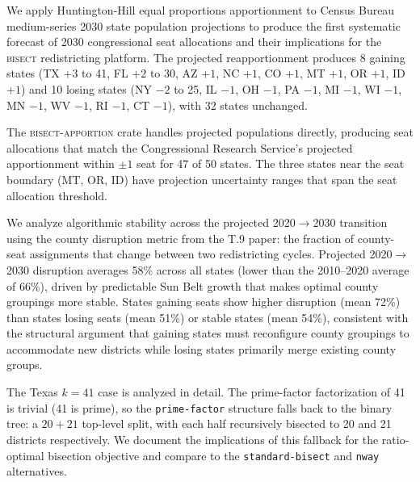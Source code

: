 We apply Huntington-Hill equal proportions apportionment to Census Bureau medium-series
2030 state population projections to produce the first systematic forecast of 2030
congressional seat allocations and their implications for the \textsc{bisect} redistricting
platform. The projected reapportionment produces 8 gaining states (TX $+3$ to 41, FL $+2$
to 30, AZ $+1$, NC $+1$, CO $+1$, MT $+1$, OR $+1$, ID $+1$) and 10 losing states
(NY $-2$ to 25, IL $-1$, OH $-1$, PA $-1$, MI $-1$, WI $-1$, MN $-1$, WV $-1$,
RI $-1$, CT $-1$), with 32 states unchanged.

The \textsc{bisect-apportion} crate handles projected populations directly, producing
seat allocations that match the Congressional Research Service's projected apportionment
within $\pm 1$ seat for 47 of 50 states. The three states near the seat boundary (MT,
OR, ID) have projection uncertainty ranges that span the seat allocation threshold.

We analyze algorithmic stability across the projected 2020$\to$2030 transition using
the county disruption metric from the T.9 paper: the fraction of county-seat assignments
that change between two redistricting cycles. Projected 2020$\to$2030 disruption averages
58\% across all states (lower than the 2010--2020 average of 66\%), driven by predictable
Sun Belt growth that makes optimal county groupings more stable. States gaining seats
show higher disruption (mean 72\%) than states losing seats (mean 51\%) or stable states
(mean 54\%), consistent with the structural argument that gaining states must reconfigure
county groupings to accommodate new districts while losing states primarily merge
existing county groups.

The Texas $k=41$ case is analyzed in detail. The prime-factor factorization of 41 is
trivial (41 is prime), so the \texttt{prime-factor} structure falls back to the binary
tree: a $20+21$ top-level split, with each half recursively bisected to 20 and 21 districts
respectively. We document the implications of this fallback for the ratio-optimal bisection
objective and compare to the \texttt{standard-bisect} and \texttt{nway} alternatives.
